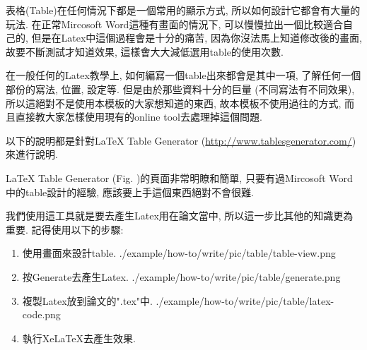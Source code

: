 

表格(Table)在任何情況下都是一個常用的顯示方式, 所以如何設計它都會有大量的玩法. 在正常Mircosoft Word這種有畫面的情況下, 可以慢慢拉出一個比較適合自己的, 但是在Latex中這個過程會是十分的痛苦, 因為你沒法馬上知道修改後的畫面, 故要不斷測試才知道效果, 這樣會大大減低選用table的使用次數.

在一般任何的Latex教學上, 如何編寫一個table出來都會是其中一項, 了解任何一個部份的寫法, 位置, 設定等. 但是由於那些資料十分的巨量 (不同寫法有不同效果), 所以這絕對不是使用本模板的大家想知道的東西, 故本模板不使用過往的方式, 而且直接教大家怎樣使用現有的online tool去處理掉這個問題.

以下的說明都是針對LaTeX Table Generator (\url{http://www.tablesgenerator.com/})來進行說明.

LaTeX Table Generator (Fig. )的頁面非常明瞭和簡單, 只要有過Mircosoft Word中的table設計的經驗, 應該要上手這個東西絕對不會很難.

\newpage
{}

\newpage
{}

  我們使用這工具就是要去產生Latex用在論文當中, 所以這一步比其他的知識更為重要. 記得使用以下的步驟:

  \begin{enumerate}
  \item
  {
    使用畫面來設計table.
    \InsertCenterImage
      {./example/how-to/write/pic/table/table-view.png}
  } %

  \item
  {
    按Generate去產生Latex.
    \InsertCenterImage
      {./example/how-to/write/pic/table/generate.png}
  } %

  \item
  {
    複製Latex放到論文的".tex"中.
    \InsertCenterImage
      {./example/how-to/write/pic/table/latex-code.png}
  } %

  \item
  {
    執行XeLaTeX去產生效果.
  } %
  \end{enumerate}


